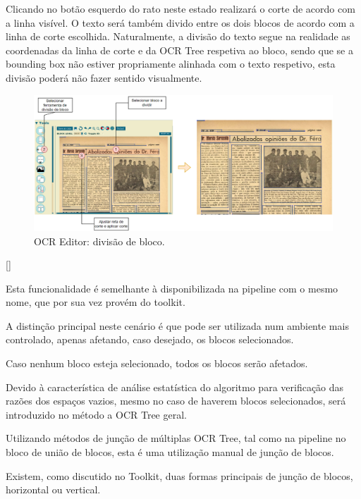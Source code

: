Clicando no botão esquerdo do rato neste estado realizará o corte de acordo com a linha visível. O texto será também divido entre os dois blocos de acordo com a linha de corte escolhida. Naturalmente, a divisão do texto segue na realidade as coordenadas da linha de corte e da OCR Tree respetiva ao bloco, sendo que se a bounding box não estiver propriamente alinhada com o texto respetivo, esta divisão poderá não fazer sentido visualmente.

\begin{figure}[H]
	\centering
	\includegraphics[width=1\textwidth]{images/ilustracoes/ocr_editor_split_block.png}
	\caption{OCR Editor: divisão de bloco.}
	\label{fig:ocr_editor_split_block}
\end{figure}



[\normalsize]

Esta funcionalidade é semelhante à disponibilizada na pipeline com o mesmo nome, que por sua vez provém do toolkit.

A distinção principal neste cenário é que pode ser utilizada num ambiente mais controlado, apenas afetando, caso desejado, os blocos selecionados.

Caso nenhum bloco esteja selecionado, todos os blocos serão afetados.

Devido à característica de análise estatística do algoritmo para verificação das razões dos espaços vazios, mesmo no caso de haverem blocos selecionados, será introduzido no método a OCR Tree geral.




Utilizando métodos de junção de múltiplas OCR Tree, tal como na pipeline no bloco de união de blocos, esta é uma utilização manual de junção de blocos.

Existem, como discutido no Toolkit, duas formas principais de junção de blocos, horizontal ou vertical.

